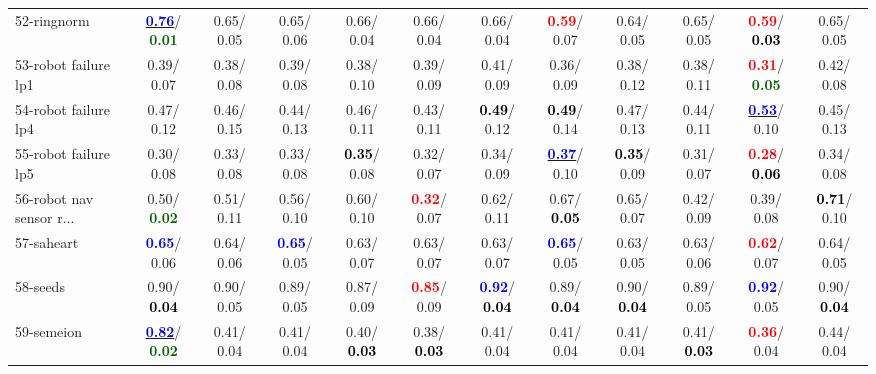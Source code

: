 \begin{table}[h]
\begin{center}
{\begin{tabular}{lc|c|c|c|c|c|c|c|c|c|c}
52-ringnorm & \underline{\textcolor{blue}{\textbf{  0.76}}}/\textcolor{darkgreen}{\textbf{  0.01}} &   0.65/  0.05 &   0.65/  0.06 &   0.66/  0.04 &   0.66/  0.04 &   0.66/  0.04 & \textcolor{red}{\textbf{  0.59}}/  0.07 &   0.64/  0.05 &   0.65/  0.05 & \textcolor{red}{\textbf{  0.59}}/\textcolor{black}{\textbf{  0.03}} &   0.65/  0.05 \\
53-robot failure lp1 &   0.39/  0.07 &   0.38/  0.08 &   0.39/  0.08 &   0.38/  0.10 &   0.39/  0.09 &   0.41/  0.09 &   0.36/  0.09 &   0.38/  0.12 &   0.38/  0.11 & \textcolor{red}{\textbf{  0.31}}/\textcolor{darkgreen}{\textbf{  0.05}} &   0.42/  0.08 \\ \hline
54-robot failure lp4 &   0.47/  0.12 &   0.46/  0.15 &   0.44/  0.13 &   0.46/  0.11 &   0.43/  0.11 & \textcolor{black}{\textbf{  0.49}}/  0.12 & \textcolor{black}{\textbf{  0.49}}/  0.14 &   0.47/  0.13 &   0.44/  0.11 & \underline{\textcolor{blue}{\textbf{  0.53}}}/  0.10 &   0.45/  0.13 \\
55-robot failure lp5 &   0.30/  0.08 &   0.33/  0.08 &   0.33/  0.08 & \textcolor{black}{\textbf{  0.35}}/  0.08 &   0.32/  0.07 &   0.34/  0.09 & \underline{\textcolor{blue}{\textbf{  0.37}}}/  0.10 & \textcolor{black}{\textbf{  0.35}}/  0.09 &   0.31/  0.07 & \textcolor{red}{\textbf{  0.28}}/\textcolor{black}{\textbf{  0.06}} &   0.34/  0.08 \\
56-robot nav sensor r... &   0.50/\textcolor{darkgreen}{\textbf{  0.02}} &   0.51/  0.11 &   0.56/  0.10 &   0.60/  0.10 & \textcolor{red}{\textbf{  0.32}}/  0.07 &   0.62/  0.11 &   0.67/\textcolor{black}{\textbf{  0.05}} &   0.65/  0.07 &   0.42/  0.09 &   0.39/  0.08 & \textcolor{black}{\textbf{  0.71}}/  0.10 \\
57-saheart & \textcolor{blue}{\textbf{  0.65}}/  0.06 &   0.64/  0.06 & \textcolor{blue}{\textbf{  0.65}}/  0.05 &   0.63/  0.07 &   0.63/  0.07 &   0.63/  0.07 & \textcolor{blue}{\textbf{  0.65}}/  0.05 &   0.63/  0.05 &   0.63/  0.06 & \textcolor{red}{\textbf{  0.62}}/  0.07 &   0.64/  0.05 \\
58-seeds &   0.90/\textcolor{black}{\textbf{  0.04}} &   0.90/  0.05 &   0.89/  0.05 &   0.87/  0.09 & \textcolor{red}{\textbf{  0.85}}/  0.09 & \textcolor{blue}{\textbf{  0.92}}/\textcolor{black}{\textbf{  0.04}} &   0.89/\textcolor{black}{\textbf{  0.04}} &   0.90/\textcolor{black}{\textbf{  0.04}} &   0.89/  0.05 & \textcolor{blue}{\textbf{  0.92}}/  0.05 &   0.90/\textcolor{black}{\textbf{  0.04}} \\
59-semeion & \underline{\textcolor{blue}{\textbf{  0.82}}}/\textcolor{darkgreen}{\textbf{  0.02}} &   0.41/  0.04 &   0.41/  0.04 &   0.40/\textcolor{black}{\textbf{  0.03}} &   0.38/\textcolor{black}{\textbf{  0.03}} &   0.41/  0.04 &   0.41/  0.04 &   0.41/  0.04 &   0.41/\textcolor{black}{\textbf{  0.03}} & \textcolor{red}{\textbf{  0.36}}/  0.04 &   0.44/  0.04 \\

\end{tabular}}
\end{center}
\end{table}
